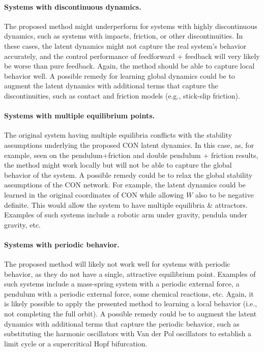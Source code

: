 \paragraph{Systems with discontinuous dynamics.}
The proposed method might underperform for systems with highly discontinuous dynamics, such as systems with impacts, friction, or other discontinuities. In these cases, the latent dynamics might not capture the real system's behavior accurately, and the control performance of feedforward + feedback will very likely be worse than pure feedback. Again, the method should be able to capture local behavior well. A possible remedy for learning global dynamics could be to augment the latent dynamics with additional terms that capture the discontinuities, such as contact and friction models (e.g., stick-slip friction).

\paragraph{Systems with multiple equilibrium points.}
The original system having multiple equilibria conflicts with the stability assumptions underlying the proposed CON latent dynamics. In this case, as, for example, seen on the pendulum+friction and double pendulum + friction results, the method might work locally but will not be able to capture the global behavior of the system. A possible remedy could be to relax the global stability assumptions of the CON network. For example, the latent dynamics could be learned in the original coordinates of CON while allowing $W$ also to be negative definite. This would allow the system to have multiple equilibria \& attractors. Examples of such systems include a robotic arm under gravity, pendula under gravity, etc.

\paragraph{Systems with periodic behavior.}
The proposed method will likely not work well for systems with periodic behavior, as they do not have a single, attractive equilibrium point. Examples of such systems include a mass-spring system with a periodic external force, a pendulum with a periodic external force, some chemical reactions, etc. Again, it is likely possible to apply the presented method to learning a local behavior (i.e., not completing the full orbit). A possible remedy could be to augment the latent dynamics with additional terms that capture the periodic behavior, such as substituting the harmonic oscillators with Van der Pol oscillators to establish a limit cycle or a supercritical Hopf bifurcation.

